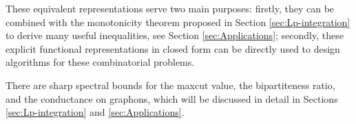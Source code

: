 \documentclass[12pt,a4paper]{article}
\newtheorem{example}[theorem]{Example}
\begin{document}
These equivalent representations serve two main purposes: firstly, they can be combined with the monotonicity theorem proposed in Section \ref{sec:Lp-integration} to derive many useful inequalities, see Section \ref{sec:Applications}; secondly, these explicit functional representations in closed form can be directly used to design algorithms for these combinatorial problems. %

There are sharp spectral bounds for the maxcut value, the bipartiteness ratio, and the conductance on graphons, which will be discussed in detail in Sections \ref{sec:Lp-integration} and \ref{sec:Applications}. 



\end{document}
